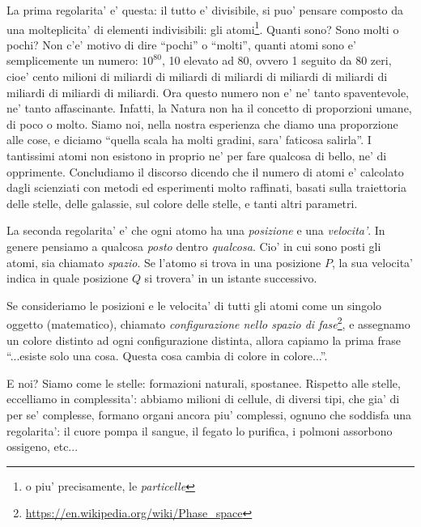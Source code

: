 La prima regolarita' e' questa: il tutto e' divisibile, si puo' pensare composto da una molteplicita' di elementi indivisibili: gli atomi\footnote{o piu' precisamente, le \emph{particelle}}.
Quanti sono? Sono molti o pochi? Non c'e' motivo di dire ``pochi'' o ``molti'', quanti atomi sono  e' semplicemente un numero: $10^{80}$, 10 elevato ad 80, ovvero 1 seguito da 80 zeri, cioe' cento milioni di miliardi di miliardi di miliardi di miliardi di miliardi di miliardi di miliardi di miliardi. 
Ora questo numero non e' ne' tanto spaventevole, ne' tanto affascinante. Infatti, la Natura non ha il concetto di proporzioni umane, di poco o molto. Siamo noi, nella nostra esperienza che diamo una proporzione alle cose, e diciamo ``quella scala ha molti gradini, sara' faticosa salirla''. 
I tantissimi atomi non esistono in proprio ne' per fare qualcosa di bello, ne' di opprimente.
Concludiamo il discorso dicendo che il numero di atomi e' calcolato dagli scienziati con metodi ed esperimenti molto raffinati, basati sulla traiettoria delle stelle, delle galassie, sul colore delle stelle, e tanti altri parametri.

La seconda regolarita' e' che ogni atomo ha una \emph{posizione} e una \emph{velocita'}. In genere pensiamo a qualcosa \emph{posto} dentro \emph{qualcosa}. Cio' in cui sono posti gli atomi, sia chiamato \emph{spazio}. Se l'atomo si trova in una posizione $P$, la sua velocita' indica in quale posizione $Q$ si trovera' in un istante successivo. 

Se consideriamo le posizioni e le velocita' di tutti gli atomi come un singolo oggetto (matematico), chiamato \emph{configurazione nello spazio di fase}\footnote{\url{https://en.wikipedia.org/wiki/Phase\_space}}, e assegnamo un colore distinto ad ogni configurazione distinta, allora capiamo la prima frase ``...esiste solo una cosa. Questa cosa cambia di colore in colore...''.

E noi? Siamo come le stelle: formazioni naturali, spostanee. Rispetto alle stelle, eccelliamo in complessita': abbiamo milioni di cellule, di diversi tipi, che gia' di per se' complesse, formano organi ancora piu' complessi, ognuno che soddisfa una regolarita': il cuore pompa il sangue, il fegato lo purifica, i polmoni assorbono ossigeno, etc...

